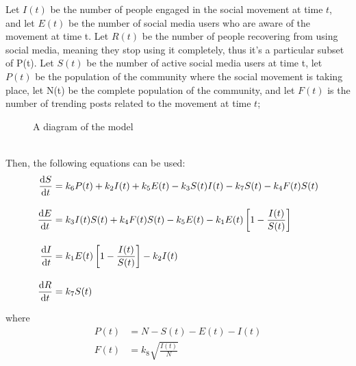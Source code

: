 \documentclass{article}
\begin{document}
     Let $I(t)$ be the number of people engaged in the social movement at time $t$, and let $E(t)$ be the number of social media users who are aware of the movement at time t. Let $R(t)$ be the number of people recovering from using social media, meaning they stop using it completely, thus it's a particular subset of P(t). Let $S(t)$ be the number of active social media users at time t, let $P(t)$ be the population of the community where the social movement is taking place, let N(t) be the complete population of the community, and let $F(t)$ is the number of trending posts related to the movement at time $t$;\\
     \begin{figure}
         \centering
        \caption{A diagram of the model}
    \end{figure}
    \\
    Then, the following equations can be used:
    \begin{subequations}
    \begin{align}            
        \diff St &= k_6 P(t) + k_2I(t) + k_5E(t) - k_3 {S(t)I(t)}- k_7S(t)-k_4 F(t)S(t)
        \\[10pt]
        \diff Et &= k_3 I(t)S(t) + k_4 F(t) S(t) - k_5E(t) - k_1E(t)\left[1 - \frac{I(t)}{S(t)}\right] 
        \\[10pt]
        \diff It &= k_1 E(t) \left[1 - \frac{I(t)}{S(t)}\right] - k_2I(t)
        \\[10pt]
        \diff Rt &= k_7S(t)
    \end{align}
    \end{subequations}
    
    where
    \begin{subequations}
    \begin{align}
        P(t) &= N - S(t) - E(t) - I(t)
        \\[10pt]
        F(t) &= k_8\sqrt{\frac{I(t)} N}
    \end{align}
    \end{subequations}
\end{document}
